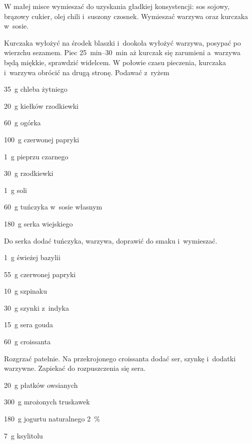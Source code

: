\documentclass[../main.tex]{subfiles}
\begin{document}
W małej misce wymieszać do uzyskania gładkiej konsystencji: sos sojowy, brązowy
cukier, olej chili i~suszony czosnek. Wymieszać warzywa oraz kurczaka w~sosie.

Kurczaka wyłożyć na środek blaszki i~dookoła wyłożyć warzywa, posypać po
wierzchu sezamem. Piec \qtyrange{25}{30}{\minute} aż kurczak się zarumieni
a~warzywa będą miękkie, sprawdzić widelcem. W połowie czasu pieczenia, kurczaka
i~warzywa obrócić na drugą stronę. Podawać z~ryżem


\begin{Ingred}
    \item \qty{35}{\gram} chleba żytniego
    \item \qty{20}{\gram} kiełków rzodkiewki
    \item \qty{60}{\gram} ogórka
    \item \qty{100}{\gram} czerwonej papryki
    \item \qty{1}{\gram} pieprzu czarnego
    \item \qty{30}{\gram} rzodkiewki
    \item \qty{1}{\gram} soli
    \item \qty{60}{\gram} tuńczyka w~sosie własnym
    \item \qty{180}{\gram} serka wiejskiego
\end{Ingred}

Do serka dodać tuńczyka, warzywa, doprawić do smaku i~wymieszać.


\begin{Ingred}
    \item \qty{1}{\gram} świeżej bazylii
    \item \qty{55}{\gram} czerwonej papryki
    \item \qty{10}{\gram} szpinaku
    \item \qty{30}{\gram} szynki z~indyka
    \item \qty{15}{\gram} sera gouda
    \item \qty{60}{\gram} croissanta
\end{Ingred}

Rozgrzać patelnie. Na przekrojonego croissanta dodać ser, szynkę i~dodatki
warzywne. Zapiekać do rozpuszczenia się sera.


\begin{Ingred}
    \item \qty{20}{\gram} płatków owsianych
    \item \qty{300}{\gram} mrożonych truskawek
    \item \qty{180}{\gram} jogurtu naturalnego \qty{2}{\percent}
    \item \qty{7}{\gram} ksylitolu
\end{Ingred}
\end{document}
